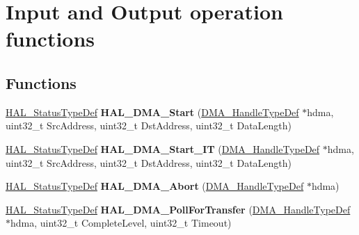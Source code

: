 \hypertarget{group___d_m_a___exported___functions___group2}{\section{Input and Output operation functions}
\label{group___d_m_a___exported___functions___group2}
}
\subsection*{Functions}
\begin{DoxyCompactItemize}
\item 
\hypertarget{group___d_m_a___exported___functions___group2_ga96fbd9c285135f558fd9283a57406330}{\hyperlink{stm32l1xx__hal__def_8h_a63c0679d1cb8b8c684fbb0632743478f}{H\-A\-L\-\_\-\-Status\-Type\-Def} {\bfseries H\-A\-L\-\_\-\-D\-M\-A\-\_\-\-Start} (\hyperlink{group___d_m_a___exported___types_ga92b907d56a9c29b93d46782a7a04f91e}{D\-M\-A\-\_\-\-Handle\-Type\-Def} $\ast$hdma, uint32\-\_\-t Src\-Address, uint32\-\_\-t Dst\-Address, uint32\-\_\-t Data\-Length)}\label{group___d_m_a___exported___functions___group2_ga96fbd9c285135f558fd9283a57406330}

\item 
\hypertarget{group___d_m_a___exported___functions___group2_ga7eddc0931ac8a3d77b23d6d5e68407c7}{\hyperlink{stm32l1xx__hal__def_8h_a63c0679d1cb8b8c684fbb0632743478f}{H\-A\-L\-\_\-\-Status\-Type\-Def} {\bfseries H\-A\-L\-\_\-\-D\-M\-A\-\_\-\-Start\-\_\-\-I\-T} (\hyperlink{group___d_m_a___exported___types_ga92b907d56a9c29b93d46782a7a04f91e}{D\-M\-A\-\_\-\-Handle\-Type\-Def} $\ast$hdma, uint32\-\_\-t Src\-Address, uint32\-\_\-t Dst\-Address, uint32\-\_\-t Data\-Length)}\label{group___d_m_a___exported___functions___group2_ga7eddc0931ac8a3d77b23d6d5e68407c7}

\item 
\hypertarget{group___d_m_a___exported___functions___group2_ga001f9fb04328a7460f9ff16908ff987c}{\hyperlink{stm32l1xx__hal__def_8h_a63c0679d1cb8b8c684fbb0632743478f}{H\-A\-L\-\_\-\-Status\-Type\-Def} {\bfseries H\-A\-L\-\_\-\-D\-M\-A\-\_\-\-Abort} (\hyperlink{group___d_m_a___exported___types_ga92b907d56a9c29b93d46782a7a04f91e}{D\-M\-A\-\_\-\-Handle\-Type\-Def} $\ast$hdma)}\label{group___d_m_a___exported___functions___group2_ga001f9fb04328a7460f9ff16908ff987c}

\item 
\hypertarget{group___d_m_a___exported___functions___group2_ga676b9606af3221a6b7bd7de264809fc7}{\hyperlink{stm32l1xx__hal__def_8h_a63c0679d1cb8b8c684fbb0632743478f}{H\-A\-L\-\_\-\-Status\-Type\-Def} {\bfseries H\-A\-L\-\_\-\-D\-M\-A\-\_\-\-Poll\-For\-Transfer} (\hyperlink{group___d_m_a___exported___types_ga92b907d56a9c29b93d46782a7a04f91e}{D\-M\-A\-\_\-\-Handle\-Type\-Def} $\ast$hdma, uint32\-\_\-t Complete\-Level, uint32\-\_\-t Timeout)}\label{group___d_m_a___exported___functions___group2_ga676b9606af3221a6b7bd7de264809fc7}


\end{DoxyCompactItemize}
